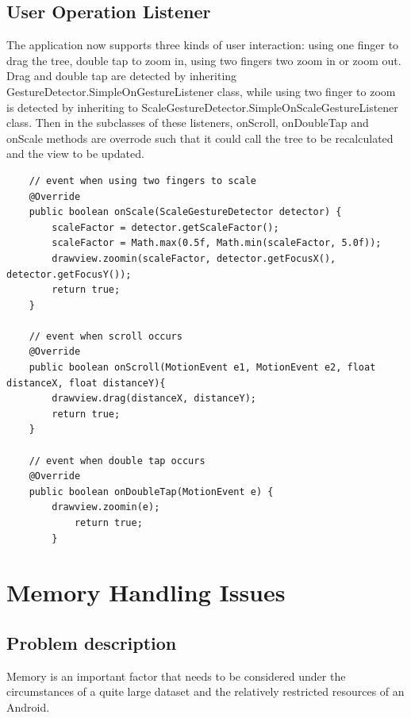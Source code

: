 \documentclass[a4paper,11pt,twoside]{report}
\begin{document}
\section{User Operation Listener}

The application now supports three kinds of user interaction: using one finger to drag the tree, double tap to zoom in, using two fingers two zoom in or zoom out. Drag and double tap are detected by inheriting GestureDetector.SimpleOnGestureListener class, while using two finger to zoom is detected by inheriting to ScaleGestureDetector.SimpleOnScaleGestureListener class. Then in the subclasses of these listeners, onScroll, onDoubleTap and onScale methods are overrode such that it could call the tree to be recalculated and the view to be updated. 

\begin{lstlisting}
	// event when using two fingers to scale
	@Override
	public boolean onScale(ScaleGestureDetector detector) {
		scaleFactor = detector.getScaleFactor();
		scaleFactor = Math.max(0.5f, Math.min(scaleFactor, 5.0f));
		drawview.zoomin(scaleFactor, detector.getFocusX(), detector.getFocusY());
		return true;
	}
	
	// event when scroll occurs
	@Override
	public boolean onScroll(MotionEvent e1, MotionEvent e2, float distanceX, float distanceY){
		drawview.drag(distanceX, distanceY);
		return true;
	}
	
	// event when double tap occurs    
	@Override
	public boolean onDoubleTap(MotionEvent e) {
		drawview.zoomin(e);
    		return true;
        }

\end{lstlisting}


\chapter{Memory Handling Issues}

\section{Problem description}

Memory is an important factor that needs to be considered under the circumstances of a quite large dataset and the relatively restricted resources of an Android.
\end{document}
